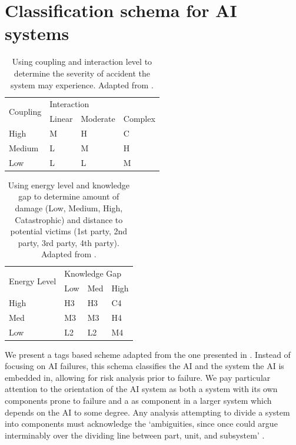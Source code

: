 \documentclass[11pt]{article}
\begin{document}
 \cite{yam2018historic}

\section{Classification schema for AI systems}
\label{sec:classification}

\begin{table}[]
\centering
\begin{tabular}{|l|l|l|l|}
\hline
\multirow{2}{*}{Coupling} & \multicolumn{3}{l|}{Interaction} \\ \cline{2-4}
        & Linear & Moderate & Complex \\ \hline
High    & M      & H        & C       \\ \hline
Medium  & L      & M        & H       \\ \hline
Low     & L      & L        & M       \\ \hline
\end{tabular}
\caption{Using coupling and interaction level to determine the severity of accident the system may
    experience. Adapted from \cite{shrivastava2009normal}.}
\label{tab:nat}
\end{table}

\begin{table}[]
\centering
\begin{tabular}{|l|l|l|l|}
\hline
\multirow{2}{*}{Energy Level} & \multicolumn{3}{l|}{Knowledge Gap} \\ \cline{2-4}
     & Low & Med & High \\ \hline
High & H3  & H3  & C4   \\ \hline
Med  & M3  & M3  & H4   \\ \hline
Low  & L2  & L2  & M4   \\ \hline
\end{tabular}
\caption{Using energy level and knowledge gap to determine amount of damage (Low, Medium, High,
Catastrophic) and distance to potential victims (1st party, 2nd party, 3rd party, 4th party).
Adapted from \cite{shrivastava2009normal}.}
\label{tab:nat2}
\end{table}

We present a tags based scheme adapted from the one presented in \cite{scott2020classification}.
Instead of focusing on AI failures, this schema classifies the AI and the system the AI is embedded
in, allowing for risk analysis prior to failure. We pay
particular attention to the orientation of the AI system as both a system with its own components
prone to failure and a as component in a larger system which depends on the AI to some degree. Any
analysis attempting to divide a system into components must acknowledge the `ambiguities, since once
could argue interminably over the dividing line between part, unit, and subsystem'
\cite{perrow1984living}.  
\end{document}

